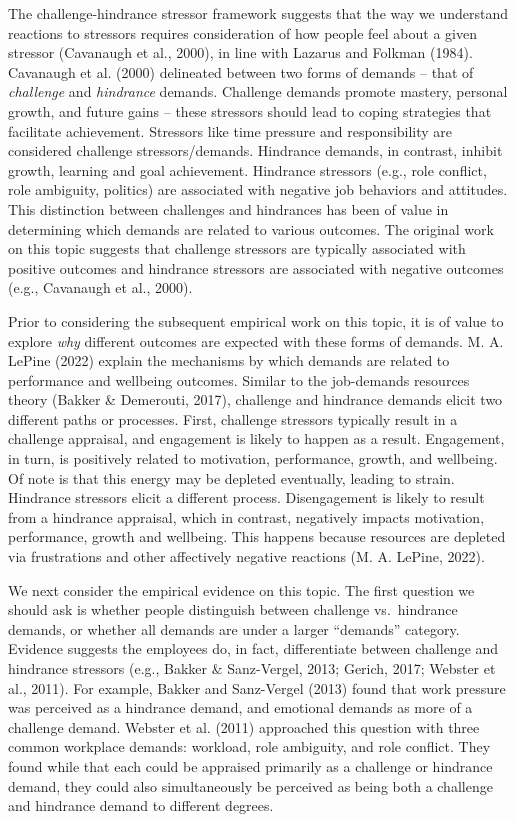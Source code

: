 \documentclass[
  english,
  man]{apa6}
\begin{document}
The challenge-hindrance stressor framework suggests that the way we understand reactions to stressors requires consideration of how people feel about a given stressor (Cavanaugh et al., 2000), in line with Lazarus and Folkman (1984). Cavanaugh et al. (2000) delineated between two forms of demands -- that of \emph{challenge} and \emph{hindrance} demands. Challenge demands promote mastery, personal growth, and future gains -- these stressors should lead to coping strategies that facilitate achievement. Stressors like time pressure and responsibility are considered challenge stressors/demands. Hindrance demands, in contrast, inhibit growth, learning and goal achievement. Hindrance stressors (e.g., role conflict, role ambiguity, politics) are associated with negative job behaviors and attitudes. This distinction between challenges and hindrances has been of value in determining which demands are related to various outcomes. The original work on this topic suggests that challenge stressors are typically associated with positive outcomes and hindrance stressors are associated with negative outcomes (e.g., Cavanaugh et al., 2000).

Prior to considering the subsequent empirical work on this topic, it is of value to explore \emph{why} different outcomes are expected with these forms of demands. M. A. LePine (2022) explain the mechanisms by which demands are related to performance and wellbeing outcomes. Similar to the job-demands resources theory (Bakker \& Demerouti, 2017), challenge and hindrance demands elicit two different paths or processes. First, challenge stressors typically result in a challenge appraisal, and engagement is likely to happen as a result. Engagement, in turn, is positively related to motivation, performance, growth, and wellbeing. Of note is that this energy may be depleted eventually, leading to strain. Hindrance stressors elicit a different process. Disengagement is likely to result from a hindrance appraisal, which in contrast, negatively impacts motivation, performance, growth and wellbeing. This happens because resources are depleted via frustrations and other affectively negative reactions (M. A. LePine, 2022).

We next consider the empirical evidence on this topic. The first question we should ask is whether people distinguish between challenge vs.~hindrance demands, or whether all demands are under a larger ``demands'' category. Evidence suggests the employees do, in fact, differentiate between challenge and hindrance stressors (e.g., Bakker \& Sanz-Vergel, 2013; Gerich, 2017; Webster et al., 2011). For example, Bakker and Sanz-Vergel (2013) found that work pressure was perceived as a hindrance demand, and emotional demands as more of a challenge demand. Webster et al. (2011) approached this question with three common workplace demands: workload, role ambiguity, and role conflict. They found while that each could be appraised primarily as a challenge or hindrance demand, they could also simultaneously be perceived as being both a challenge and hindrance demand to different degrees.
\end{document}
